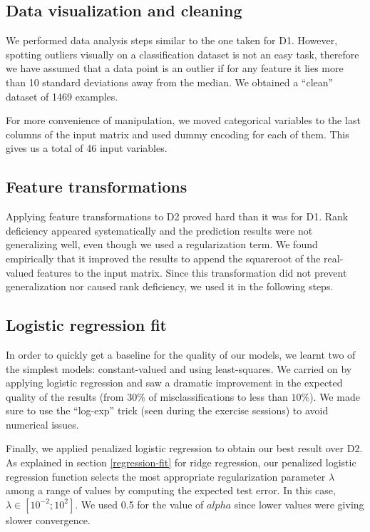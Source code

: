 \documentclass{article} %
\begin{document}
  \subsection{Data visualization and cleaning}
  We performed data analysis steps similar to the one taken for D1. However, spotting outliers visually on a classification dataset is not an easy task, therefore we have assumed that a data point is an outlier if for any feature it lies more than 10 standard deviations away from the median. We obtained a ``clean'' dataset of 1469 examples.

  For more convenience of manipulation, we moved categorical variables to the last columns of the input matrix and used dummy encoding for each of them. This gives us a total of 46 input variables.

  \subsection{Feature transformations}
  Applying feature transformations to D2 proved hard than it was for D1. Rank deficiency appeared systematically and the prediction results were not generalizing well, even though we used a regularization term. We found empirically that it improved the results to append the squareroot of the real-valued features to the input matrix. Since this transformation did not prevent generalization nor caused rank deficiency, we used it in the following steps.

  \subsection{Logistic regression fit}
  In order to quickly get a baseline for the quality of our models, we learnt two of the simplest models: constant-valued and using least-squares. We carried on by applying logistic regression and saw a dramatic improvement in the expected quality of the results (from $30\%$ of misclassifications to less than $10\%$). We made sure to use the ``log-exp'' trick (seen during the exercise sessions) to avoid numerical issues.

  Finally, we applied penalized logistic regression to obtain our best result over D2. As explained in section \ref{regression-fit} for ridge regression, our penalized logistic regression function selects the most appropriate regularization parameter $\lambda$ among a range of values by computing the expected test error. In this case, $\lambda \in [10^{-2}; 10^2]$. We used 0.5 for the value of $alpha$ since lower values were giving slower convergence.
\end{document}
